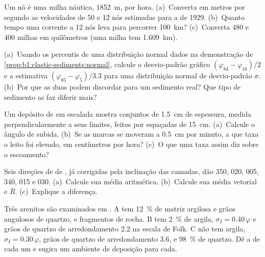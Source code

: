 \begin{exercise}[$\star$]\label{exo:b1:clastic-sediments:4}
Um nó é uma milha náutica, \qty{1852}{m}, por hora. (a)~Converta em metros por segundo as velocidades de 50 e 12 nós estimadas para a  de 1929. (b)~Quanto tempo uma corrente a 12 nós leva para percorrer \qty{100}{km}? (c)~Converta 480 e 400 milhas em quilômetros (uma milha tem \qty{1.609}{km}).
\end{exercise}

\begin{exercise}[$\star\star$]\label{exo:b1:clastic-sediments:5}
(a)~Usando os percentis de uma distribuição normal dados na demonstração de \cref{prop:b1:clastic-sediments:normal}, calcule o desvio-padrão gráfico $(\varphi_{84} - \varphi_{16})/2$ e a estimativa $(\varphi_{95} - \varphi_5)/3.3$ para uma distribuição normal de desvio-padrão $\sigma$. (b)~Por que as duas podem discordar para um sedimento real? Que tipo de sedimento as faz diferir mais?
\end{exercise}

\begin{exercise}[$\star\star$]\label{exo:b1:clastic-sediments:6}
Um depósito de  em escalada mostra conjuntos de \qty{1.5}{cm} de espessura, medida perpendicularmente a seus limites, feitos por  espaçadas de \qty{15}{cm}. (a)~Calcule o ângulo de subida. (b)~Se as marcas se moveram a \qty{0.5}{cm} por minuto, a que taxa o leito foi elevado, em centímetros por hora? (c)~O que uma taxa assim diz sobre o escoamento?
\end{exercise}

\begin{exercise}[$\star\star$]\label{exo:b1:clastic-sediments:7}
Seis direções de  de , já corrigidas pela inclinação das camadas, dão 350, 020, 005, 340, 015 e 030. (a)~Calcule sua média aritmética. (b)~Calcule sua média vetorial e $\bar R$. (c)~Explique a diferença.
\end{exercise}

\begin{exercise}[$\star\star$]\label{exo:b1:clastic-sediments:8}
Três arenitos são examinados em . A tem \qty{12}{\percent} de matriz argilosa e grãos angulosos de quartzo,  e fragmentos de rocha. B tem \qty{2}{\percent} de argila, $\sigma_I = 0.40\,\varphi$ e grãos de quartzo de arredondamento \num{2.2} na escala de Folk. C não tem argila, $\sigma_I =
0.30\,\varphi$, grãos de quartzo de arredondamento \num{3.6}, e \qty{98}{\percent} de quartzo. Dê a  de cada um e sugira um ambiente de deposição para cada.
\end{exercise}

